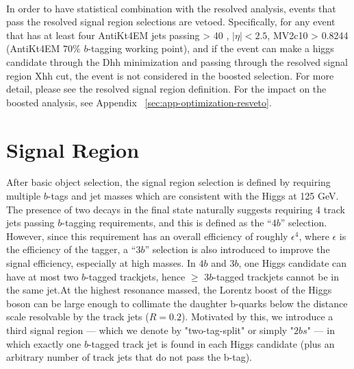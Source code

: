\paragraph{}
In order to have statistical combination with the resolved analysis, events that pass the resolved signal region selections are vetoed. Specifically, for any event that has at least four AntiKt4EM jets passing \pt > 40 \GeV, $|\eta| < 2.5$, MV2c10 > 0.8244 (AntiKt4EM $70\%$ $b$-tagging working point), and if the event can make a higgs candidate through the Dhh minimization and passing through the resolved signal region Xhh cut, the event is not considered in the boosted selection. For more detail, please see the resolved signal region definition. For the impact on the boosted analysis, see Appendix ~\ref{sec:app-optimization-resveto}.


\section{Signal Region}
After basic object selection, the signal region selection is defined by requiring multiple $b$-tags and jet masses which are consistent with the Higgs at 125 GeV. The presence of two \hbb decays in the final state naturally suggests requiring 4 track jets passing $b$-tagging requirements, and this is defined as the ``$4b$'' selection. However, since this requirement has an overall efficiency of roughly $\epsilon^4$, where $\epsilon$ is the efficiency of the tagger, a ``$3b$'' selection is also introduced to improve the signal efficiency, especially at high masses. In $4b$ and $3b$, one Higgs candidate can have at most two $b$-tagged trackjets, hence $\geq$ $3b$-tagged trackjets cannot be in the same \largeR jet.At the highest resonance massed, the Lorentz boost of the Higgs boson can be large enough to collimate the daughter b-quarks below the distance scale resolvable by the track jets ($R=0.2$). Motivated by this, we introduce a third signal region --- which we denote by "two-tag-split" or simply  "$2bs$" --- in which exactly one $b$-tagged track jet is found in each Higgs candidate (plus an arbitrary number of track jets that do not pass the b-tag).

